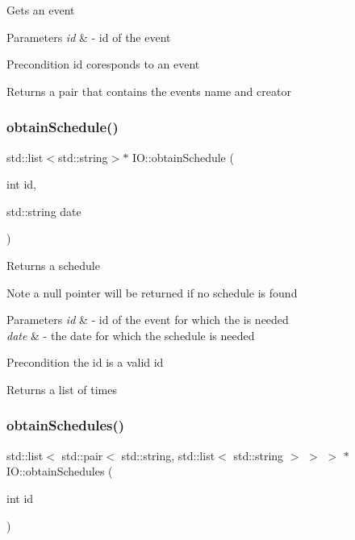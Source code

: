 Gets an event 
\begin{DoxyParams}{Parameters}
{\em id} & -\/ id of the event \\
\hline
\end{DoxyParams}
\begin{DoxyPrecond}{Precondition}
id coresponds to an event 
\end{DoxyPrecond}
\begin{DoxyReturn}{Returns}
a pair that contains the event\textquotesingle{}s name and creator 
\end{DoxyReturn}
\mbox{\label{classIO_a2d8629709827d3797b4f26b9ef108f03}} 
\subsubsection{\texorpdfstring{obtain\+Schedule()}{obtainSchedule()}}
{\footnotesize\ttfamily std\+::list$<$std\+::string$>$$\ast$ I\+O\+::obtain\+Schedule (\begin{DoxyParamCaption}\item[{int}]{id,  }\item[{std\+::string}]{date }\end{DoxyParamCaption})}

Returns a schedule \begin{DoxyNote}{Note}
a null pointer will be returned if no schedule is found 
\end{DoxyNote}

\begin{DoxyParams}{Parameters}
{\em id} & -\/ id of the event for which the is needed \\
\hline
{\em date} & -\/ the date for which the schedule is needed \\
\hline
\end{DoxyParams}
\begin{DoxyPrecond}{Precondition}
the id is a valid id 
\end{DoxyPrecond}
\begin{DoxyReturn}{Returns}
a list of times 
\end{DoxyReturn}
\mbox{\label{classIO_ae36363fbeda79e6e3f962d9e985eb23b}} 
\subsubsection{\texorpdfstring{obtain\+Schedules()}{obtainSchedules()}}
{\footnotesize\ttfamily std\+::list$<$ std\+::pair$<$ std\+::string, std\+::list$<$ std\+::string $>$ $>$ $>$ $\ast$ I\+O\+::obtain\+Schedules (\begin{DoxyParamCaption}\item[{int}]{id }\end{DoxyParamCaption})}

